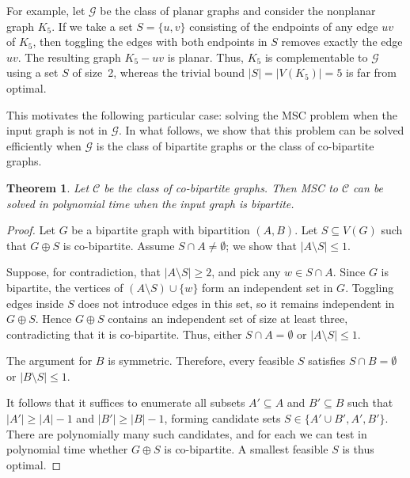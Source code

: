 \documentclass[11pt]{article}
\newtheorem{theorem}{Theorem}
\theoremstyle{definition}
\begin{document}
For example, let $\mathcal{G}$ be the class of planar graphs and consider the nonplanar graph $K_5$. 
If we take a set $S = \{u,v\}$ consisting of the endpoints of any edge $uv$ of $K_5$, 
then toggling the edges with both endpoints in $S$ removes exactly the edge $uv$. 
The resulting graph $K_5 - uv$ is planar. Thus, $K_5$ is complementable to $\mathcal{G}$ using a set $S$ 
of size~2, whereas the trivial bound $|S| = |V(K_5)| = 5$ is far from optimal.


This motivates the following particular case: solving the MSC problem when the input graph is not in $\mathcal{G}$. 
In what follows, we show that this problem can be solved efficiently when 
$\mathcal{G}$ is the class of bipartite graphs or the class of co-bipartite graphs.

\begin{theorem}
\label{thm:bipartite-cobipartite}
Let $\mathcal{C}$ be the class of co-bipartite graphs. 
Then MSC to $\mathcal{C}$ can be solved in polynomial time when the input graph is bipartite.
\end{theorem}
\begin{proof}
Let $G$ be a bipartite graph with bipartition $(A,B)$.
Let $S \subseteq V(G)$ such that $G \oplus S$ is co-bipartite.  
Assume $S \cap A \neq \emptyset$; we show that $|A \setminus S| \le 1$.  

Suppose, for contradiction, that $|A \setminus S| \ge 2$, and pick any $w \in S \cap A$.  
Since $G$ is bipartite, the vertices of $(A \setminus S) \cup \{w\}$ form an independent set in $G$.  
Toggling edges inside $S$ does not introduce edges in this set, so it remains independent in $G \oplus S$.  
Hence $G \oplus S$ contains an independent set of size at least three, contradicting that it is co-bipartite.  
Thus, either $S \cap A = \emptyset$ or $|A \setminus S| \le 1$.  

The argument for $B$ is symmetric.  
Therefore, every feasible $S$ satisfies $S \cap B = \emptyset$ or $|B \setminus S| \le 1$.

It follows that it suffices to enumerate all subsets $A' \subseteq A$ and $B' \subseteq B$ such that
$|A'| \ge |A|-1$ and $|B'| \ge |B|-1$, forming candidate sets $S \in \{A' \cup B', A', B'\}$.  
There are polynomially many such candidates, and for each we can test in polynomial time whether $G \oplus S$ is co-bipartite.  
A smallest feasible $S$ is thus optimal.
\end{proof}
\end{document}
